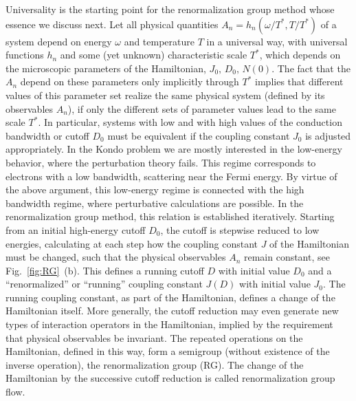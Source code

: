 \documentclass[12pt,twoside]{article}
\begin{document}
Universality is the starting point for the renormalization 
group method  whose essence we discuss next.
Let all physical quantities $A_n=h_n(\omega/T^*,T/T^*)$ of a system 
depend on energy $\omega$ and temperature $T$ in a universal way, with  
universal functions $h_n$ and some (yet unknown) characteristic scale $T^*$, 
which depends on the microscopic parameters of the Hamiltonian,
$J_0,\,D_0,\,N(0)$. The fact that the $A_n$ depend on these parameters only
implicitly through $T^*$ implies that different values of this 
parameter set realize the same physical system (defined by its observables 
$A_n$), if only the different sets of parameter values lead to 
the same scale $T^*$. 
In particular, systems with low and with high values of the conduction 
bandwidth or cutoff $D_0$ 
must be equivalent if the coupling constant $J_0$ is 
adjusted appropriately. In the Kondo problem we are mostly interested 
in the low-energy behavior, where the perturbation theory fails. This 
regime corresponds to electrons with a low bandwidth, 
scattering near the Fermi energy. By virtue of the above argument, 
this low-energy regime is connected with the high bandwidth regime,
where perturbative calculations are possible. 
In the renormalization group method, this relation is established 
iteratively. Starting from an initial high-energy cutoff $D_0$, the 
cutoff is stepwise reduced to low energies, calculating at each step how the 
coupling constant $J$ of the Hamiltonian must be changed,
such that the physical observables $A_n$ remain constant, see 
Fig.~\ref{fig:RG}~(b). This defines a running cutoff $D$ with initial 
value $D_0$ and a ``renormalized'' or ``running'' coupling constant $J(D)$
with initial value $J_0$. The running coupling constant, as part of the 
Hamiltonian, defines a change of the Hamiltonian itself.
More generally, the cutoff reduction may even generate 
new types of interaction operators in the Hamiltonian, implied by the 
requirement that physical observables be invariant. The repeated operations 
on the Hamiltonian, defined in this way, form a semigroup (without 
existence of the inverse operation), the renormalization group (RG). 
The change of the Hamiltonian by the successive cutoff reduction is called
renormalization group flow. 
\end{document}
